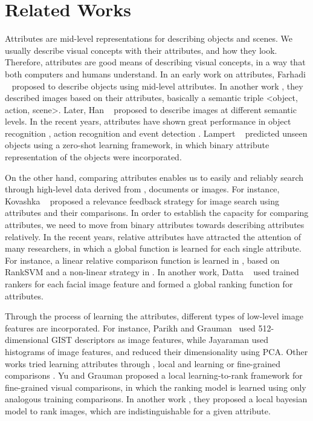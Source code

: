 

\section{Related Works}


Attributes are mid-level representations for describing objects and scenes. We usually describe visual concepts with their attributes, and how they look. Therefore, attributes are good means of describing visual concepts, in a way that both computers and humans understand. In an early work on attributes, Farhadi \etal~\cite{Farhadi09describingobjects} proposed to describe objects using mid-level attributes. In another work \cite{farhadi10}, they described images based on their attributes, basically a semantic triple <object, action, scene>. Later, Han \etal~\cite{6739133} proposed to describe images at different semantic levels. In the recent years, attributes have shown great performance in object recognition \cite{Farhadi09describingobjects,7298613}, action recognition \cite{6838985,5995353} and event detection \cite{6475038}. Lampert \etal~\cite{6571196} predicted unseen objects using a zero-shot learning framework, in which binary attribute representation of the objects were incorporated. 

On the other hand, comparing attributes enables us to easily and reliably search through high-level data derived from \eg, documents or images. For instance, Kovashka \etal~\cite{KovashkaG13} proposed a relevance feedback strategy for image search using attributes and their comparisons. In order to establish the capacity for comparing attributes, we need to move from binary attributes towards describing attributes relatively. In the recent years, relative attributes have attracted the attention of many researchers, in which a global function is learned for each single attribute. For instance, a linear relative comparison function is learned in \cite{parikh2011}, based on RankSVM \cite{Joachims2002} and a non-linear strategy in \cite{Li2013}. In another work, Datta \etal~\cite{5771429} used trained rankers for each facial image feature and formed a global ranking function for attributes.

Through the process of learning the attributes, different types of low-level image features are incorporated. For instance, Parikh and Grauman~\cite{parikh2011} used 512-dimensional GIST \cite{Aude01} descriptors as image features, while Jayaraman \etal\cite{6909607} used histograms of image features, and reduced their dimensionality using PCA. Other works tried learning attributes through \eg, local and learning \cite{1641014} or fine-grained comparisons \cite{Yu2014}. Yu and Grauman \cite{Yu2014} proposed a local learning-to-rank framework for fine-grained visual comparisons, in which the ranking model is learned using only analogous training comparisons. In another work \cite{Yu2015}, they proposed a local bayesian model to rank images, which are indistinguishable for a given attribute. 

